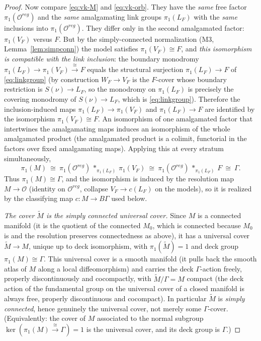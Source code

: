 \documentclass[12pt]{article}
\theoremstyle{definition}
\begin{document}
\begin{proof}
Now compare \eqref{eq:vk-M} and \eqref{eq:vk-orb}. They have the \emph{same}
free factor $\pi_1(\mathcal O^{reg})$ and the \emph{same} amalgamating link
groups $\pi_1(L_F)$ with the \emph{same} inclusions into $\pi_1(\mathcal
O^{reg})$. They differ only in the second amalgamated factor: $\pi_1(V_F)$ versus
$F$. But by the simply-connected normalization (M3, Lemma~\ref{lem:simpconn}) the
model satisfies $\pi_1(V_F)\cong F$, and \emph{this isomorphism is compatible
with the link inclusion}: the boundary monodromy
$\pi_1(L_F)\to\pi_1(V_F)\xrightarrow{\cong}F$ equals the structural surjection
$\pi_1(L_F)\to F$ of \eqref{eq:linkgroup} (by construction $W_F\to V_F$ is the
$F$-cover whose boundary restriction is $S(\nu)\to L_F$, so the monodromy on
$\pi_1(L_F)$ is precisely the covering monodromy of $S(\nu)\to L_F$, which is
\eqref{eq:linkgroup}). Therefore the inclusion-induced maps
$\pi_1(L_F)\to\pi_1(V_F)$ and $\pi_1(L_F)\to F$ are identified by the
isomorphism $\pi_1(V_F)\cong F$. An isomorphism of one amalgamated factor that
intertwines the amalgamating maps induces an isomorphism of the whole
amalgamated product (the amalgamated product is a colimit, functorial in the
factors over fixed amalgamating maps). Applying this at every stratum
simultaneously,
\[
   \pi_1(M)\ \cong\ \pi_1(\mathcal O^{reg})\,*_{\pi_1(L_F)}\,\pi_1(V_F)
   \ \cong\ \pi_1(\mathcal O^{reg})\,*_{\pi_1(L_F)}\,F\ \cong\ \Gamma .
\]
Thus $\pi_1(M)\cong\Gamma$, and the isomorphism is induced by the resolution map
$M\to\mathcal O$ (identity on $\mathcal O^{reg}$, collapse $V_F\to c(L_F)$ on the
models), so it is realized by the classifying map $c\colon M\to B\Gamma$ used
below.

\emph{The cover $\widetilde M$ is the simply connected universal cover.} Since
$M$ is a connected manifold (it is the quotient of the connected $\widehat M_0$,
which is connected because $M_0$ is and the resolution preserves connectedness as
above), it has a universal cover $\widetilde M\to M$, unique up to deck
isomorphism, with $\pi_1(\widetilde M)=1$ and deck group $\pi_1(M)\cong\Gamma$.
This universal cover is a smooth manifold (it pulls back the smooth atlas of $M$
along a local diffeomorphism) and carries the deck $\Gamma$-action freely,
properly discontinuously and cocompactly, with $\widetilde M/\Gamma=M$ compact
(the deck action of the fundamental group on the universal cover of a closed
manifold is always free, properly discontinuous and cocompact). In particular
$\widetilde M$ is \emph{simply connected}, hence genuinely the universal cover,
not merely some $\Gamma$-cover. (Equivalently: the cover of $M$ associated to the
normal subgroup $\ker(\pi_1(M)\xrightarrow{\cong}\Gamma)=1$ is the universal
cover, and its deck group is $\Gamma$.)


\end{proof}
\end{document}
